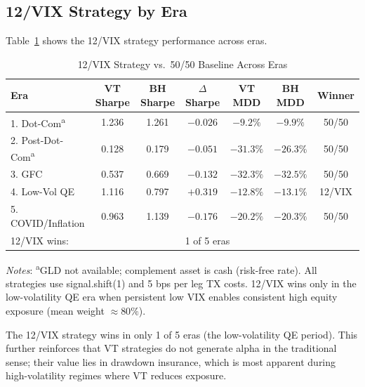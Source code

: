 \documentclass[12pt,a4paper]{article}
\begin{document}
\subsection{12/VIX Strategy by Era}

Table~\ref{tab:strategy_eras} shows the 12/VIX strategy performance across eras.

\begin{table}[H]
\centering
\small
\begin{threeparttable}
\caption{12/VIX Strategy vs.\ 50/50 Baseline Across Eras}
\label{tab:strategy_eras}
\begin{tabular}{@{}lcccccc@{}}
\toprule
Era & VT Sharpe & BH Sharpe & $\Delta$Sharpe & VT MDD & BH MDD & Winner \\
\midrule
1. Dot-Com\textsuperscript{a} & 1.236 & 1.261 & $-0.026$ & $-9.2\%$ & $-9.9\%$ & 50/50 \\
2. Post-Dot-Com\textsuperscript{a} & 0.128 & 0.179 & $-0.051$ & $-31.3\%$ & $-26.3\%$ & 50/50 \\
3. GFC & 0.537 & 0.669 & $-0.132$ & $-32.3\%$ & $-32.5\%$ & 50/50 \\
4. Low-Vol QE & 1.116 & 0.797 & $+0.319$ & $-12.8\%$ & $-13.1\%$ & 12/VIX \\
5. COVID/Inflation & 0.963 & 1.139 & $-0.176$ & $-20.2\%$ & $-20.3\%$ & 50/50 \\
\midrule
\multicolumn{3}{l}{12/VIX wins:} & \multicolumn{4}{l}{1 of 5 eras} \\
\bottomrule
\end{tabular}
\begin{tablenotes}
\small
\item \textit{Notes}: \textsuperscript{a}GLD not available; complement asset is cash (risk-free rate). All strategies use signal.shift(1) and 5 bps per leg TX costs. 12/VIX wins only in the low-volatility QE era when persistent low VIX enables consistent high equity exposure (mean weight $\approx 80\%$).
\end{tablenotes}
\end{threeparttable}
\end{table}

The 12/VIX strategy wins in only 1 of 5 eras (the low-volatility QE period). This further reinforces that VT strategies do not generate alpha in the traditional sense; their value lies in drawdown insurance, which is most apparent during high-volatility regimes where VT reduces exposure.
\end{document}
